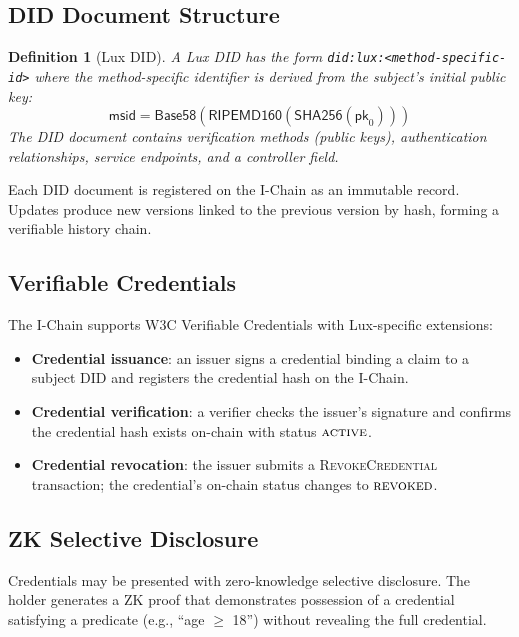 \documentclass[11pt,a4paper]{article}
\newtheorem{definition}{Definition}[section]
\begin{document}
\subsection{DID Document Structure}

\begin{definition}[Lux DID]\label{def:did}
A Lux DID has the form \texttt{did:lux:<method-specific-id>} where the
method-specific identifier is derived from the subject's initial public key:
\[
    \mathsf{msid} = \mathsf{Base58}(\mathsf{RIPEMD160}(\mathsf{SHA256}(\mathsf{pk}_0)))
\]
The DID document contains verification methods (public keys), authentication
relationships, service endpoints, and a controller field.
\end{definition}

Each DID document is registered on the I-Chain as an immutable record. Updates
produce new versions linked to the previous version by hash, forming a verifiable
history chain.

\subsection{Verifiable Credentials}

The I-Chain supports W3C Verifiable Credentials with Lux-specific extensions:
\begin{itemize}
    \item \textbf{Credential issuance}: an issuer signs a credential binding a
          claim to a subject DID and registers the credential hash on the I-Chain.
    \item \textbf{Credential verification}: a verifier checks the issuer's
          signature and confirms the credential hash exists on-chain with status
          $\textsc{active}$.
    \item \textbf{Credential revocation}: the issuer submits a
          \textsc{RevokeCredential} transaction; the credential's on-chain status
          changes to $\textsc{revoked}$.
\end{itemize}

\subsection{ZK Selective Disclosure}

Credentials may be presented with zero-knowledge selective disclosure. The holder
generates a ZK proof that demonstrates possession of a credential satisfying a
predicate (e.g., ``age $\geq$ 18'') without revealing the full credential.
\end{document}
